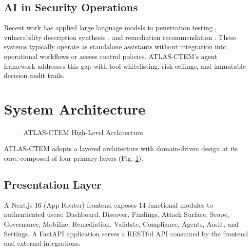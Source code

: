 \documentclass[conference]{IEEEtran}
\begin{document}
\subsection{AI in Security Operations}

Recent work has applied large language models to penetration testing \cite{deng2023pentestgpt}, vulnerability description synthesis \cite{chen2023}, and remediation recommendation \cite{ferrag2023}. These systems typically operate as standalone assistants without integration into operational workflows or access control policies. ATLAS-CTEM's agent framework addresses this gap with tool whitelisting, risk ceilings, and immutable decision audit trails.

\section{System Architecture}

\begin{figure}[t]
  \centering
  \caption{ATLAS-CTEM High-Level Architecture}
  \label{fig:arch}
\end{figure}

ATLAS-CTEM adopts a layered architecture with domain-driven design at its core, composed of four primary layers (Fig. \ref{fig:arch}).

\subsection{Presentation Layer}

A Next.js 16 (App Router) frontend exposes 14 functional modules to authenticated users: Dashboard, Discover, Findings, Attack Surface, Scope, Governance, Mobilize, Remediation, Validate, Compliance, Agents, Audit, and Settings. A FastAPI application serves a RESTful API consumed by the frontend and external integrations.
\end{document}
